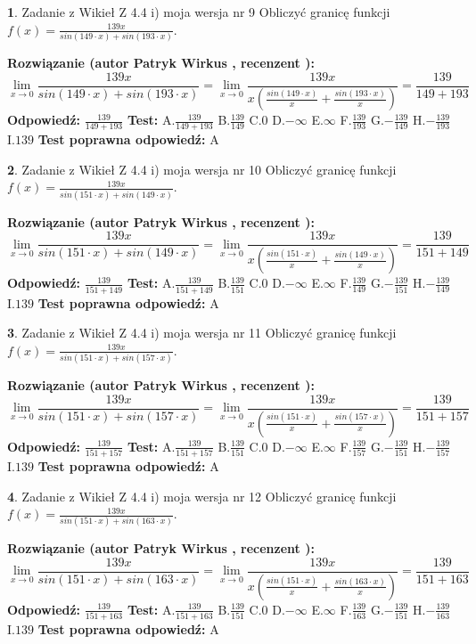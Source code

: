 \documentclass[12pt, a4paper]{article}
\theoremstyle{definition} %
\newtheorem{zad}{}
\newcommand{\zadStart}[1]{\begin{zad}#1\newline}
\newcommand{\zadStop}{\end{zad}}
\newcommand{\rozwStart}[2]{\noindent \textbf{Rozwiązanie (autor #1 , recenzent #2): }\newline}
\newcommand{\rozwStop}{\newline}
\newcommand{\odpStart}{\noindent \textbf{Odpowiedź:}\newline}
\newcommand{\odpStop}{\newline}
\newcommand{\testStart}{\noindent \textbf{Test:}\newline}
\newcommand{\testStop}{\newline}
\newcommand{\kluczStart}{\noindent \textbf{Test poprawna odpowiedź:}\newline}
\newcommand{\kluczStop}{\newline}
\begin{document}
\zadStart{Zadanie z Wikieł Z 4.4 i) moja wersja nr 9}
Obliczyć granicę funkcji $f(x)=\frac{139x}{sin(149\cdot x) +sin(193\cdot x)}$.
\zadStop
\rozwStart{Patryk Wirkus}{}
$$\lim\limits_{x\to 0}\frac{139x}{sin(149\cdot x) +sin(193\cdot x)}=\lim\limits_{x\to 0}\frac{139x}{x(\frac{sin(149\cdot x)}{x}+\frac{sin(193\cdot x)}{x})}=\frac{139}{149+193}$$
\rozwStop
\odpStart
$\frac{139}{149+193}$
\odpStop
\testStart
A.$\frac{139}{149+193}$
B.$\frac{139}{149}$
C.$0$
D.$-\infty$
E.$\infty$
F.$\frac{139}{193}$
G.$-\frac{139}{149}$
H.$-\frac{139}{193}$
I.$139$
\testStop
\kluczStart
A
\kluczStop



\zadStart{Zadanie z Wikieł Z 4.4 i) moja wersja nr 10}
Obliczyć granicę funkcji $f(x)=\frac{139x}{sin(151\cdot x) +sin(149\cdot x)}$.
\zadStop
\rozwStart{Patryk Wirkus}{}
$$\lim\limits_{x\to 0}\frac{139x}{sin(151\cdot x) +sin(149\cdot x)}=\lim\limits_{x\to 0}\frac{139x}{x(\frac{sin(151\cdot x)}{x}+\frac{sin(149\cdot x)}{x})}=\frac{139}{151+149}$$
\rozwStop
\odpStart
$\frac{139}{151+149}$
\odpStop
\testStart
A.$\frac{139}{151+149}$
B.$\frac{139}{151}$
C.$0$
D.$-\infty$
E.$\infty$
F.$\frac{139}{149}$
G.$-\frac{139}{151}$
H.$-\frac{139}{149}$
I.$139$
\testStop
\kluczStart
A
\kluczStop



\zadStart{Zadanie z Wikieł Z 4.4 i) moja wersja nr 11}
Obliczyć granicę funkcji $f(x)=\frac{139x}{sin(151\cdot x) +sin(157\cdot x)}$.
\zadStop
\rozwStart{Patryk Wirkus}{}
$$\lim\limits_{x\to 0}\frac{139x}{sin(151\cdot x) +sin(157\cdot x)}=\lim\limits_{x\to 0}\frac{139x}{x(\frac{sin(151\cdot x)}{x}+\frac{sin(157\cdot x)}{x})}=\frac{139}{151+157}$$
\rozwStop
\odpStart
$\frac{139}{151+157}$
\odpStop
\testStart
A.$\frac{139}{151+157}$
B.$\frac{139}{151}$
C.$0$
D.$-\infty$
E.$\infty$
F.$\frac{139}{157}$
G.$-\frac{139}{151}$
H.$-\frac{139}{157}$
I.$139$
\testStop
\kluczStart
A
\kluczStop



\zadStart{Zadanie z Wikieł Z 4.4 i) moja wersja nr 12}
Obliczyć granicę funkcji $f(x)=\frac{139x}{sin(151\cdot x) +sin(163\cdot x)}$.
\zadStop
\rozwStart{Patryk Wirkus}{}
$$\lim\limits_{x\to 0}\frac{139x}{sin(151\cdot x) +sin(163\cdot x)}=\lim\limits_{x\to 0}\frac{139x}{x(\frac{sin(151\cdot x)}{x}+\frac{sin(163\cdot x)}{x})}=\frac{139}{151+163}$$
\rozwStop
\odpStart
$\frac{139}{151+163}$
\odpStop
\testStart
A.$\frac{139}{151+163}$
B.$\frac{139}{151}$
C.$0$
D.$-\infty$
E.$\infty$
F.$\frac{139}{163}$
G.$-\frac{139}{151}$
H.$-\frac{139}{163}$
I.$139$
\testStop
\kluczStart
A
\kluczStop
\end{document}
